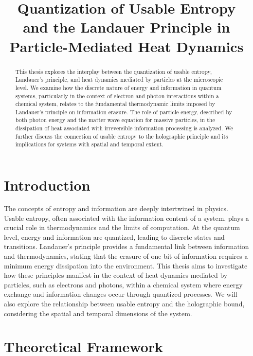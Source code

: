 \documentclass{article}
\begin{document}
	
	\title{Quantization of Usable Entropy and the Landauer Principle in Particle-Mediated Heat Dynamics}
	\author{}
	\date{}
	\maketitle
	
	\begin{abstract}
		This thesis explores the interplay between the quantization of usable entropy, Landauer's principle, and heat dynamics mediated by particles at the microscopic level. We examine how the discrete nature of energy and information in quantum systems, particularly in the context of electron and photon interactions within a chemical system, relates to the fundamental thermodynamic limits imposed by Landauer's principle on information erasure. The role of particle energy, described by both photon energy and the matter wave equation for massive particles, in the dissipation of heat associated with irreversible information processing is analyzed. We further discuss the connection of usable entropy to the holographic principle and its implications for systems with spatial and temporal extent.
	\end{abstract}
	
	\section{Introduction}
	The concepts of entropy and information are deeply intertwined in physics. Usable entropy, often associated with the information content of a system, plays a crucial role in thermodynamics and the limits of computation. At the quantum level, energy and information are quantized, leading to discrete states and transitions. Landauer's principle provides a fundamental link between information and thermodynamics, stating that the erasure of one bit of information requires a minimum energy dissipation into the environment. This thesis aims to investigate how these principles manifest in the context of heat dynamics mediated by particles, such as electrons and photons, within a chemical system where energy exchange and information changes occur through quantized processes. We will also explore the relationship between usable entropy and the holographic bound, considering the spatial and temporal dimensions of the system.
	
	\section{Theoretical Framework}
	
\end{document}
